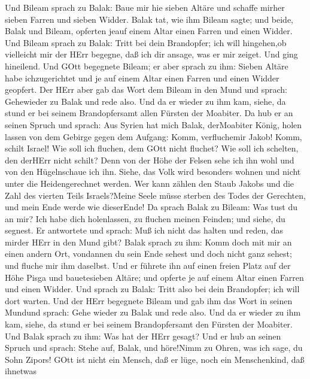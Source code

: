  Und Bileam sprach zu Balak: Baue mir hie sieben Altäre und
schaffe mirher sieben Farren und sieben Widder.  Balak tat,
wie ihm Bileam sagte; und beide, Balak und Bileam, opferten jeauf einem
Altar einen Farren und einen Widder.  Und Bileam sprach zu
Balak: Tritt bei dein Brandopfer; ich will hingehen,ob vielleicht mir
der HErr begegne, daß ich dir ansage, was er mir zeiget. Und ging
hineilend.  Und GOtt begegnete Bileam; er aber sprach zu
ihm: Sieben Altäre habe ichzugerichtet und je auf einem Altar einen
Farren und einen Widder geopfert.  Der HErr aber gab das
Wort dem Bileam in den Mund und sprach: Gehewieder zu Balak und rede
also.  Und da er wieder zu ihm kam, siehe, da stund er bei
seinem Brandopfersamt allen Fürsten der Moabiter.  Da hub er
an seinen Spruch und sprach: Aus Syrien hat mich Balak, derMoabiter
König, holen lassen von dem Gebirge gegen dem Aufgang: Komm,
verfluchemir Jakob! Komm, schilt Israel!  Wie soll ich
fluchen, dem GOtt nicht fluchet? Wie soll ich schelten, den derHErr
nicht schilt?  Denn von der Höhe der Felsen sehe ich ihn
wohl und von den Hügelnschaue ich ihn. Siehe, das Volk wird besonders
wohnen und nicht unter die Heidengerechnet werden.  Wer
kann zählen den Staub Jakobs und die Zahl des vierten Teils
Israels?Meine Seele müsse sterben des Todes der Gerechten, und mein Ende
werde wie dieserEnde!  Da sprach Balak zu Bileam: Was tust
du an mir? Ich habe dich holenlassen, zu fluchen meinen Feinden; und
siehe, du segnest.  Er antwortete und sprach: Muß ich nicht
das halten und reden, das mirder HErr in den Mund gibt? 
Balak sprach zu ihm: Komm doch mit mir an einen andern Ort, vondannen du
sein Ende sehest und doch nicht ganz sehest; und fluche mir ihm
daselbst.  Und er führete ihn auf einen freien Platz auf
der Höhe Pisga und bauetesieben Altäre; und opferte je auf einem Altar
einen Farren und einen Widder.  Und sprach zu Balak: Tritt
also bei dein Brandopfer; ich will dort warten.  Und der
HErr begegnete Bileam und gab ihm das Wort in seinen Mundund sprach:
Gehe wieder zu Balak und rede also.  Und da er wieder zu
ihm kam, siehe, da stund er bei seinem Brandopfersamt den Fürsten der
Moabiter. Und Balak sprach zu ihm: Was hat der HErr gesagt?
 Und er hub an seinen Spruch und sprach: Stehe auf, Balak,
und höre!Nimm zu Ohren, was ich sage, du Sohn Zipors!  GOtt
ist nicht ein Mensch, daß er lüge, noch ein Menschenkind, daß ihnetwas
